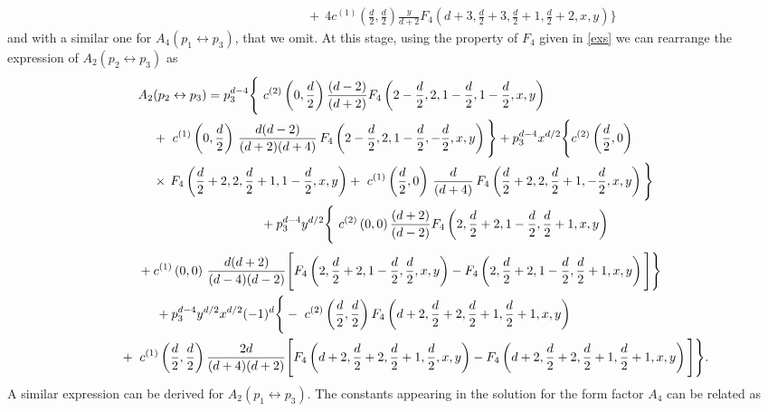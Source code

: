 \documentclass[a4paper,11pt,openright,twoside]{book}
\numberwithin{equation}{section}
\begin{document}
{{\begin{align}
	&\hspace{4cm}+\ 4c^{(1)}\left(\frac{d}{2},\frac{d}{2}\right)\frac{y}{d+2}F_4\left(d+3,\frac{d}{2}+3,\frac{d}{2}+1,\frac{d}{2}+2,x,y\right)\Bigg\}
\end{align}
and with a similar one for $A_4(p_1\leftrightarrow p_3)$, that we omit. At this stage, using the property of $F_4$ given in \eqref{exs} we can rearrange the expression of $A_2(p_2\leftrightarrow p_3)$ as
\begin{align}
	A_2(p_2\leftrightarrow p_3)&=p_3^{d-4}\Bigg\{\ c^{(2)}\left(0,\frac{d}{2}\right)\frac{(d-2)}{(d+2)}F_4\left(2-\frac{d}{2},2,1-\frac{d}{2},1-\frac{d}{2},x,y\right)\notag\\
	&\hspace{-1.5cm}+\ c^{(1)}\left(0,\frac{d}{2}\right)\,\frac{d(d-2)}{(d+2)(d+4)}\,F_4\left(2-\frac{d}{2},2,1-\frac{d}{2},-\frac{d}{2},x,y\right)\Bigg\}+p_3^{d-4}x^{d/2}\Bigg\{c^{(2)}\left(\frac{d}{2},0\right)\notag\\
	&\hspace{-1.5cm}\times\,F_4\left(\frac{d}{2}+2,2,\frac{d}{2}+1,1-\frac{d}{2},x,y\right)+\ c^{(1)}\left(\frac{d}{2},0\right)\,\frac{d}{(d+4)}\,F_4\left(\frac{d}{2}+2,2,\frac{d}{2}+1,-\frac{d}{2},x,y\right)\Bigg\}\notag\\
	&\hspace{1.5cm}+p_3^{d-4}y^{d/2}\Bigg\{\ c^{(2)}\left(0,0\right)\frac{(d+2)}{(d-2)}F_4\left(2,\frac{d}{2}+2,1-\frac{d}{2},\frac{d}{2}+1,x,y\right)\notag
\end{align}
\begin{align}
	&\hspace{1.5cm}+c^{(1)}\left(0,0\right)\,\frac{d(d+2)}{(d-4)(d-2)} \Bigg[F_4\left(2,\frac{d}{2}+2,1-\frac{d}{2},\frac{d}{2},x,y\right)-F_4\left(2,\frac{d}{2}+2,1-\frac{d}{2},\frac{d}{2}+1,x,y\right)\Bigg]\Bigg\}\notag\\
	&\hspace{2cm}+p_3^{d-4}y^{d/2}x^{d/2}(-1)^d\Bigg\{-\ c^{(2)}\left(\frac{d}{2},\frac{d}{2}\right)F_4\left(d+2,\frac{d}{2}+2,\frac{d}{2}+1,\frac{d}{2}+1,x,y\right)\,\notag\\
	&\hspace{1cm}+\ c^{(1)}\left(\frac{d}{2},\frac{d}{2}\right)\frac{2d}{(d+4)(d+2)}\Bigg[F_4\left(d+2,\frac{d}{2}+2,\frac{d}{2}+1,\frac{d}{2},x,y\right)-F_4\left(d+2,\frac{d}{2}+2,\frac{d}{2}+1,\frac{d}{2}+1,x,y\right)\Bigg]\Bigg\}.
\end{align}
A similar expression can be derived for $A_2(p_1\leftrightarrow p_3)$.
The  constants appearing in the solution for the form factor $A_4$ can be related as
}}
\end{document}
